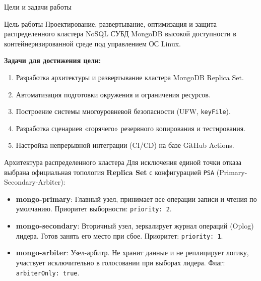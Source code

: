 \documentclass[10pt]{beamer}
\begin{document}
	\begin{frame}{Цели и задачи работы}
		\begin{block}{Цель работы}
			Проектирование, развертывание, оптимизация и защита распределенного кластера NoSQL СУБД MongoDB высокой доступности в контейнеризированной среде под управлением ОС Linux.
		\end{block}
		\vfill
		\textbf{Задачи для достижения цели:}
		\begin{enumerate}
			\item Разработка архитектуры и развертывание кластера MongoDB Replica Set.
			\item Автоматизация подготовки окружения и ограничения ресурсов.
			\item Построение системы многоуровневой безопасности (UFW, \texttt{keyFile}).
			\item Разработка сценариев «горячего» резервного копирования и тестирования.
			\item Настройка непрерывной интеграции (CI/CD) на базе GitHub Actions.
		\end{enumerate}
	\end{frame}
	
	\begin{frame}{Архитектура распределенного кластера}
		Для исключения единой точки отказа выбрана официальная топология \textbf{Replica Set} с конфигурацией \texttt{PSA} (Primary-Secondary-Arbiter):
		\vfill
		\begin{itemize}
			\item \textbf{mongo-primary}: Главный узел, принимает все операции записи и чтения по умолчанию. Приоритет выборности: \texttt{priority: 2}.
			\item \textbf{mongo-secondary}: Вторичный узел, зеркалирует журнал операций (Oplog) лидера. Готов занять его место при сбое. Приоритет: \texttt{priority: 1}.
			\item \textbf{mongo-arbiter}: Узел-арбитр. Не хранит данные и не реплицирует логику, участвует исключительно в голосовании при выборах лидера. Флаг: \texttt{arbiterOnly: true}.
		\end{itemize}
	\end{frame}
	
\end{document}
